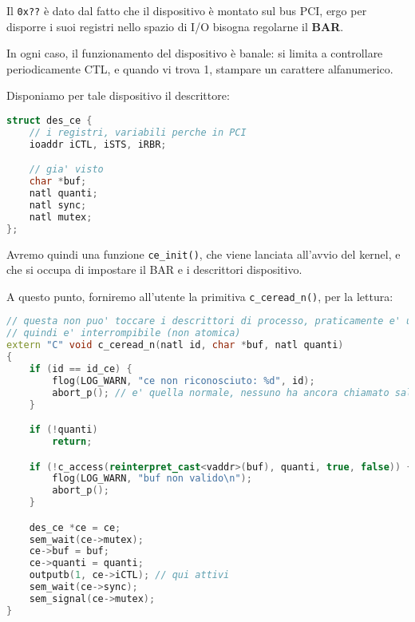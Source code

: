 \documentclass[a4paper,11pt]{article}
\begin{document}
Il \lstinline|0x??| è dato dal fatto che il dispositivo è montato sul bus PCI, ergo per disporre i suoi registri nello spazio di I/O bisogna regolarne il \textbf{BAR}.

In ogni caso, il funzionamento del dispositivo è banale: si limita a controllare periodicamente CTL, e quando vi trova 1, stampare un carattere alfanumerico.

Disponiamo per tale dispositivo il descrittore:
\begin{lstlisting}[language=C++, style=codestyle]	
struct des_ce {
	// i registri, variabili perche in PCI
	ioaddr iCTL, iSTS, iRBR;

	// gia' visto
	char *buf;
	natl quanti;
	natl sync;
	natl mutex;
};
\end{lstlisting}

Avremo quindi una funzione \lstinline|ce_init()|, che viene lanciata all'avvio del kernel, e che si occupa di impostare il BAR e i descrittori dispositivo. 

A questo punto, forniremo all'utente la primitiva \lstinline|c_ceread_n()|, per la lettura:
\begin{lstlisting}[language=C++, style=codestyle]	
// questa non puo' toccare i descrittori di processo, praticamente e' una chiamata di funzione,
// quindi e' interrompibile (non atomica)
extern "C" void c_ceread_n(natl id, char *buf, natl quanti)
{
	if (id == id_ce) {
		flog(LOG_WARN, "ce non riconosciuto: %d", id);
		abort_p(); // e' quella normale, nessuno ha ancora chiamato salva_stato
	}

	if (!quanti)
		return;

	if (!c_access(reinterpret_cast<vaddr>(buf), quanti, true, false)) {
		flog(LOG_WARN, "buf non valido\n");
		abort_p();
	}

	des_ce *ce = ce;
	sem_wait(ce->mutex);
	ce->buf = buf;
	ce->quanti = quanti;
	outputb(1, ce->iCTL); // qui attivi 
	sem_wait(ce->sync);
	sem_signal(ce->mutex);
}
\end{lstlisting}
\end{document}
